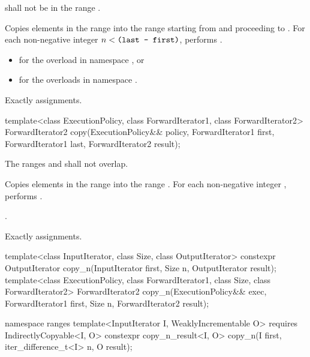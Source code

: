 \begin{itemdescr}
\pnum
\requires {} shall not be in the range .

\pnum
\effects Copies elements in the range  into the range  starting from  and proceeding to .
For each non-negative integer $n < \texttt{(last - first)}$, performs .

\pnum
\returns
\begin{itemize}
\item
{} for the overload in namespace , or
\item
{} for the overloads in
namespace .
\end{itemize}

\pnum
\complexity Exactly  assignments.
\end{itemdescr}

%
\begin{itemdecl}
template<class ExecutionPolicy, class ForwardIterator1, class ForwardIterator2>
  ForwardIterator2 copy(ExecutionPolicy&& policy,
                        ForwardIterator1 first, ForwardIterator1 last,
                        ForwardIterator2 result);
\end{itemdecl}

\begin{itemdescr}
\pnum
\requires The ranges  and
 shall not overlap.

\pnum
\effects Copies elements in the range  into
the range .
For each non-negative integer ,
performs .

\pnum
\returns {}.

\pnum
\complexity Exactly  assignments.
\end{itemdescr}

%
\begin{itemdecl}
template<class InputIterator, class Size, class OutputIterator>
  constexpr OutputIterator copy_n(InputIterator first, Size n,
                                  OutputIterator result);
template<class ExecutionPolicy, class ForwardIterator1, class Size, class ForwardIterator2>
  ForwardIterator2 copy_n(ExecutionPolicy&& exec,
                          ForwardIterator1 first, Size n,
                          ForwardIterator2 result);

namespace ranges {
  template<InputIterator I, WeaklyIncrementable O>
    requires IndirectlyCopyable<I, O>
    constexpr copy_n_result<I, O>
      copy_n(I first, iter_difference_t<I> n, O result);
}
\end{itemdecl}

